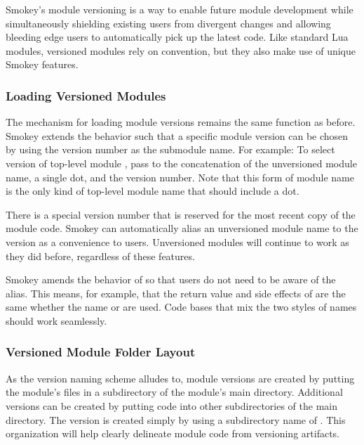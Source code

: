 Smokey's module versioning is a way to enable future module development while
simultaneously shielding existing users from divergent changes and allowing
bleeding edge users to automatically pick up the latest code.  Like standard
Lua modules, versioned modules rely on convention, but they also make use of
unique Smokey features.

\subsubsection{Loading Versioned Modules}

The mechanism for loading module versions remains the same 
function as before.  Smokey extends the  behavior such that a
specific module version can be chosen by using the version number as the
submodule name.  For example: To select version  of top-level
module , pass to  the concatenation of the
unversioned module name, a single dot, and the version number.  Note that this
form of module name is the only kind of top-level module name that should
include a dot.

There is a special  version number that is reserved for the
most recent copy of the module code.  Smokey can automatically alias an
unversioned module name to the  version as a convenience to
users.  Unversioned modules will continue to work as they did before,
regardless of these features.

Smokey amends the behavior of  so that users do not need to be
aware of the  alias.  This means, for example, that the return
value and side effects of  are the same whether the name
 or  are used.  Code bases that mix the two
styles of names should work seamlessly.

\subsubsection{Versioned Module Folder Layout}

As the version naming scheme alludes to, module versions are created by putting
the module's files in a subdirectory of the module's main directory. Additional
versions can be created by putting code into other subdirectories of the main
directory.  The  version is created simply by using a
subdirectory name of .  This organization will help clearly
delineate module code from versioning artifacts.

